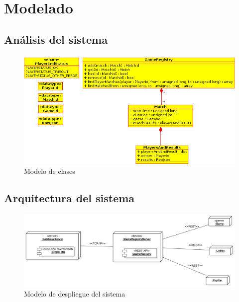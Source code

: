 \chapter{Modelado}

\section{Análisis del sistema}
\begin{figure}[h] 
 \includegraphics[scale=0.6]{./diagrams/class_diagram_iter2.png}
 \caption{Modelo de clases}
 \label{fig:clases}
\end{figure}


\section{Arquitectura del sistema}
\begin{figure}[h]
 \includegraphics[scale=0.4]{diagrams/deployment_diagram.png}
 \caption{Modelo de despliegue del sistema}
 \label{fig:arquitectura}
\end{figure}
